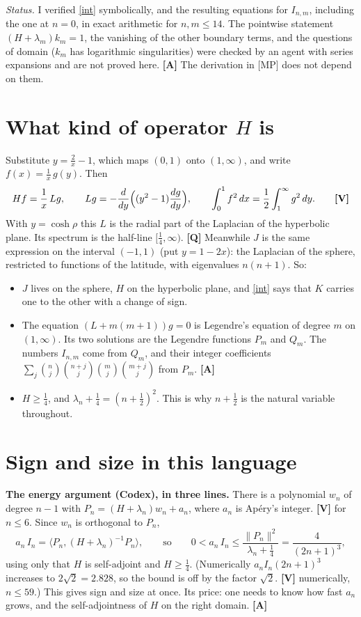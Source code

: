 \documentclass[11pt]{article}
\newcommand{\ip}[2]{\langle #1,#2\rangle}
\newcommand{\q}[1]{\medskip\noindent\textbf{#1}}
\begin{document}
\emph{Status.} I verified \eqref{int} symbolically, and the resulting equations for $I_{n,m}$,
including the one at $n=0$, in exact arithmetic for $n,m\le14$. The pointwise statement
$(H+\lambda_m)k_m=1$, the vanishing of the other boundary terms, and the questions of domain
($k_m$ has logarithmic singularities) were checked by an agent with series expansions and are not
proved here. \textbf{[A]} The derivation in [MP] does not depend on them.

\section{What kind of operator $H$ is}

Substitute $y=\frac2x-1$, which maps $(0,1)$ onto $(1,\infty)$, and write $f(x)=\frac1x\,g(y)$. Then
\[
Hf=\frac1x\,Lg,\qquad Lg=-\frac d{dy}\Bigl((y^2-1)\frac{dg}{dy}\Bigr),\qquad
\int_0^1f^2\,dx=\frac12\int_1^\infty g^2\,dy.\qquad\textbf{[V]}
\]
With $y=\cosh\rho$ this $L$ is the radial part of the Laplacian of the hyperbolic plane. Its
spectrum is the half-line $[\frac14,\infty)$. \textbf{[Q]} Meanwhile $J$ is the same expression on
the interval $(-1,1)$ (put $y=1-2x$): the Laplacian of the sphere, restricted to functions of the
latitude, with eigenvalues $n(n+1)$. So:
\begin{itemize}
\item $J$ lives on the sphere, $H$ on the hyperbolic plane, and \eqref{int} says that $K$ carries
one to the other with a change of sign.
\item The equation $(L+m(m+1))g=0$ is Legendre's equation of degree $m$ on $(1,\infty)$. Its two
solutions are the Legendre functions $P_m$ and $Q_m$. The numbers $I_{n,m}$ come from $Q_m$, and
their integer coefficients $\sum_j\binom nj\binom{n+j}j\binom mj\binom{m+j}j$ from $P_m$.
\textbf{[A]}
\item $H\ge\frac14$, and $\lambda_n+\frac14=(n+\frac12)^2$. This is why $n+\frac12$ is the natural
variable throughout.
\end{itemize}

\section{Sign and size in this language}

\q{The energy argument (Codex), in three lines.} There is a polynomial $w_n$ of degree $n-1$ with
$P_n=(H+\lambda_n)w_n+a_n$, where $a_n$ is Ap\'ery's integer. \textbf{[V]} for $n\le6$. Since $w_n$
is orthogonal to $P_n$,
\[
a_n\,I_n=\ip{P_n}{(H+\lambda_n)^{-1}P_n},\qquad\text{so}\qquad
0<a_n\,I_n\le\frac{\|P_n\|^2}{\lambda_n+\frac14}=\frac4{(2n+1)^3},
\]
using only that $H$ is self-adjoint and $H\ge\frac14$. (Numerically $a_nI_n(2n+1)^3$ increases to
$2\sqrt2=2.828$, so the bound is off by the factor $\sqrt2$. \textbf{[V]} numerically, $n\le59$.)
This gives sign and size at once. Its price: one needs to know how fast $a_n$ grows, and the
self-adjointness of $H$ on the right domain. \textbf{[A]}
\end{document}
